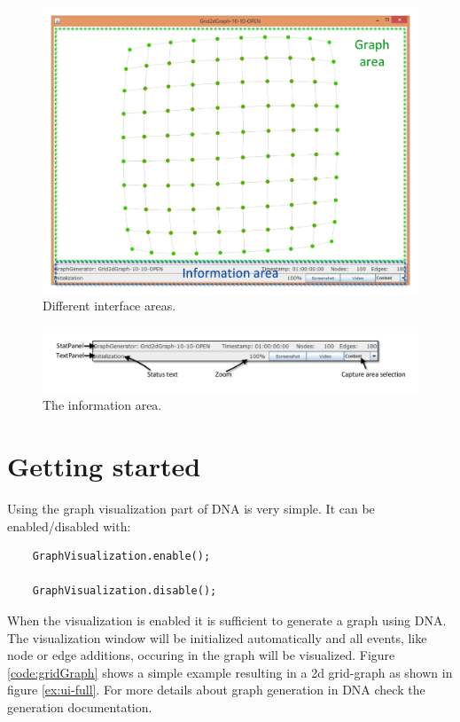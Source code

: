 \begin{figure} [h]
\centering
\includegraphics [scale=0.45] {images/ui-areas.pdf}
\caption{Different interface areas.}
\label{ex:ui-areas}
\end{figure}
\begin{figure} [h]
\centering
\includegraphics [scale=0.6] {images/ui-information.pdf}
\caption{The information area.}
\label{ex:ui-information}
\end{figure}

\section{Getting started}
\label{s:start}
Using the graph visualization part of DNA is very simple. It can be enabled/disabled with:
\begin{lstlisting}
	GraphVisualization.enable();
	
	GraphVisualization.disable();
\end{lstlisting}
When the visualization is enabled it is sufficient to generate a graph using DNA. The visualization window will be initialized automatically and all events, like node or edge additions, occuring in the graph will be visualized. Figure \ref{code:gridGraph} shows a simple example resulting in a 2d grid-graph as shown in figure \ref{ex:ui-full}. For more details about graph generation in DNA check the generation documentation.


